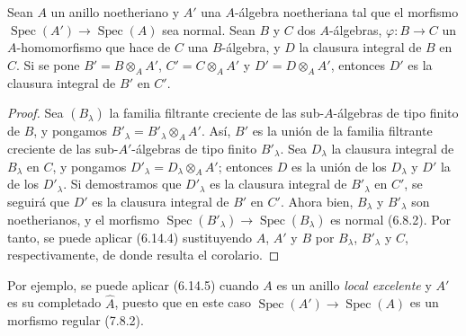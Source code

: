 \begin{corollary}[6.14.5]
\label{IV.2.s6.14.5-fr}
Sean $A$ un anillo noetheriano y $A'$ una $A$-álgebra noetheriana
tal que el morfismo $\operatorname{Spec}(A')\to\operatorname{Spec}(A)$
sea normal. Sean $B$ y $C$ dos $A$-álgebras,
$\varphi:B\to C$ un $A$-homomorfismo que hace de $C$ una
$B$-álgebra, y $D$ la clausura integral de $B$ en $C$. Si se pone
$B'=B\otimes_A A'$, $C'=C\otimes_A A'$ y $D'=D\otimes_A A'$,
entonces $D'$ es la clausura integral de $B'$ en $C'$.
\end{corollary}

\begin{proof}
Sea $(B_\lambda)$ la familia filtrante creciente de las
sub-$A$-álgebras de tipo finito de $B$, y pongamos
$B'_\lambda=B'_\lambda\otimes_A A'$. Así, $B'$ es la unión de la
familia filtrante creciente de las sub-$A'$-álgebras de tipo finito
$B'_\lambda$. Sea $D_\lambda$ la clausura integral de $B_\lambda$
en $C$, y pongamos $D'_\lambda=D_\lambda\otimes_A A'$; entonces
$D$ es la unión de los $D_\lambda$ y $D'$ la de los $D'_\lambda$.
Si demostramos que $D'_\lambda$ es la clausura integral de
$B'_\lambda$ en $C'$, se seguirá que $D'$ es la clausura integral
de $B'$ en $C'$. Ahora bien, $B_\lambda$ y $B'_\lambda$ son
noetherianos, y el morfismo
$\operatorname{Spec}(B'_\lambda)\to\operatorname{Spec}(B_\lambda)$
es normal (6.8.2). Por tanto, se puede aplicar (6.14.4) sustituyendo
$A$, $A'$ y $B$ por $B_\lambda$, $B'_\lambda$ y $C$,
respectivamente, de donde resulta el corolario.
\end{proof}

Por ejemplo, se puede aplicar (6.14.5) cuando $A$ es un anillo \emph{local excelente} y $A'$ es su completado $\widehat A$, puesto que
en este caso $\operatorname{Spec}(A')\to\operatorname{Spec}(A)$
es un morfismo regular (7.8.2).
